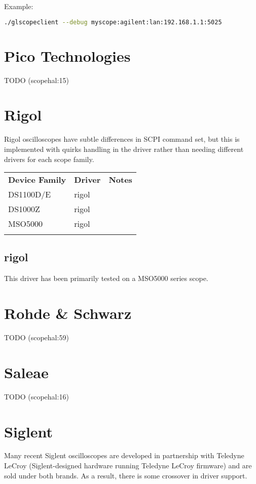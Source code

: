Example:
\begin{lstlisting}[language=sh]
./glscopeclient --debug myscope:agilent:lan:192.168.1.1:5025
\end{lstlisting}


\section{Pico Technologies}
TODO (scopehal:15)

\section{Rigol}

Rigol oscilloscopes have subtle differences in SCPI command set, but this is implemented with quirks handling in the
driver rather than needing different drivers for each scope family.

\begin{tabularx}{16cm}{llX}
\thickhline
\textbf{Device Family} & \textbf{Driver} & \textbf{Notes} \\
\thickhline
DS1100D/E & rigol & \\
\thickhline
DS1000Z & rigol & \\
\thickhline
MSO5000 & rigol & \\
\thickhline
\end{tabularx}

\subsection{rigol}

This driver has been primarily tested on a MSO5000 series scope.

\section{Rohde \& Schwarz}
TODO (scopehal:59)

\section{Saleae}
TODO (scopehal:16)

\section{Siglent}

Many recent Siglent oscilloscopes are developed in partnership with Teledyne LeCroy (Siglent-designed hardware running
Teledyne LeCroy firmware) and are sold under both brands. As a result, there is some crossover in driver support. \\

